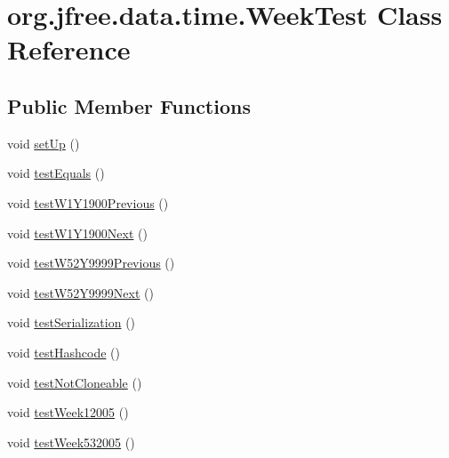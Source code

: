 \hypertarget{classorg_1_1jfree_1_1data_1_1time_1_1_week_test}{}\section{org.\+jfree.\+data.\+time.\+Week\+Test Class Reference}
\label{classorg_1_1jfree_1_1data_1_1time_1_1_week_test}
\subsection*{Public Member Functions}
\begin{DoxyCompactItemize}
\item 
void \mbox{\hyperlink{classorg_1_1jfree_1_1data_1_1time_1_1_week_test_a14fc317c68fde71404095ca22facec11}{set\+Up}} ()
\item 
void \mbox{\hyperlink{classorg_1_1jfree_1_1data_1_1time_1_1_week_test_a6f94ea144faabdb7ad82d0539b65f570}{test\+Equals}} ()
\item 
void \mbox{\hyperlink{classorg_1_1jfree_1_1data_1_1time_1_1_week_test_a64b516a8f32a4697bed5f3d20f13d197}{test\+W1\+Y1900\+Previous}} ()
\item 
void \mbox{\hyperlink{classorg_1_1jfree_1_1data_1_1time_1_1_week_test_a5fb947ca0b77238be416b5f8fcb4210b}{test\+W1\+Y1900\+Next}} ()
\item 
void \mbox{\hyperlink{classorg_1_1jfree_1_1data_1_1time_1_1_week_test_a90fcc52a3b9d0dcc334d4d46829e4f72}{test\+W52\+Y9999\+Previous}} ()
\item 
void \mbox{\hyperlink{classorg_1_1jfree_1_1data_1_1time_1_1_week_test_abadd975e16efc8d6e8cbfa87db3ae482}{test\+W52\+Y9999\+Next}} ()
\item 
void \mbox{\hyperlink{classorg_1_1jfree_1_1data_1_1time_1_1_week_test_a7f4a825018c3aee37421021de39e897d}{test\+Serialization}} ()
\item 
void \mbox{\hyperlink{classorg_1_1jfree_1_1data_1_1time_1_1_week_test_a0b0a6b1bd3004cf60f5c21329ee47fde}{test\+Hashcode}} ()
\item 
void \mbox{\hyperlink{classorg_1_1jfree_1_1data_1_1time_1_1_week_test_ac604314b3a5c68858707988684f3e7f4}{test\+Not\+Cloneable}} ()
\item 
void \mbox{\hyperlink{classorg_1_1jfree_1_1data_1_1time_1_1_week_test_af358a4218ddded9fa14e0f1adf3ef7e5}{test\+Week12005}} ()
\item 
void \mbox{\hyperlink{classorg_1_1jfree_1_1data_1_1time_1_1_week_test_a25f195d16a3677d27101524762df04a5}{test\+Week532005}} ()

\end{DoxyCompactItemize}
